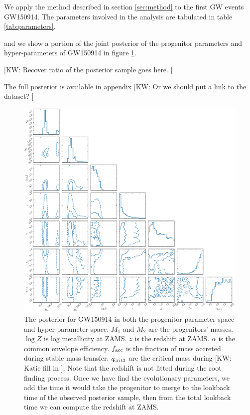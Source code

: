 \documentclass[twocolumn]{aastex631}
\newcommand{\kw}[1]{{\color{rb4}[KW: #1 ]}}
\begin{document}
We apply the method described in section \ref{sec:method} to the first GW events GW150914.
The parameters involved in the analysis are tabulated in table \ref{tab:parameters}.

and we show a portion of the joint posterior of the progenitor parameters and hyper-parameters of GW150914 in figure \ref{fig:GW150914_posterior}.

\kw{Recover ratio of the posterior sample goes here.}

The full posterior is available in appendix \kw{Or we should put a link to the dataset?}

\begin{figure}[h]
\includegraphics[width=\textwidth]{static/GW150914_corner_zoomed.pdf}
\caption{The posterior for GW150914 in both the progenitor parameter space and hyper-parameter space.
$M_1$ and $M_2$ are the progenitors' masses. $\log{Z}$ is log metallicity at ZAMS.
$z$ is the redshift at ZAMS. 
$\alpha$ is the common envelope efficiency.
$f_{\rm acc}$ is the fraction of mass accreted during stable mass transfer.
$q_{\rm crit 3}$ are the critical mass during \kw{Katie fill in},
Note that the redshift is not fitted during the root finding process.
Once we have find the evolutionary parameters, we add the time it would take the progenitor to merge to the lookback time of the observed posterior sample,
then from the total lookback time we can compute the redshift at ZAMS.
}
\label{fig:GW150914_posterior}
\end{figure}
\end{document}
